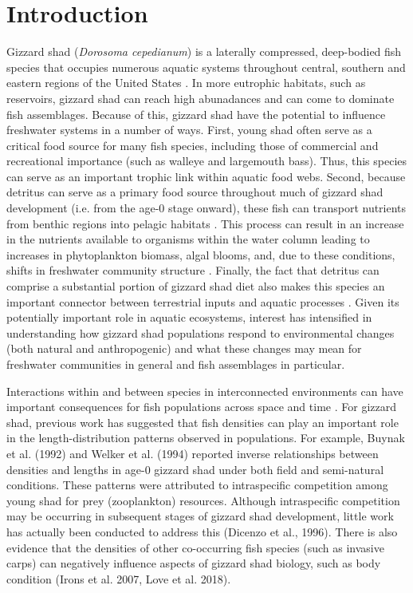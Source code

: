 \documentclass[preprint,review,12pt,authoryear]{elsarticle}
\begin{document}
\section{Introduction}
Gizzard shad (\emph{Dorosoma cepedianum}) is a laterally compressed, deep-bodied fish species that occupies numerous aquatic systems throughout central, southern and eastern regions of the United States \citep{pierce1981aspects,vanni2005linking}.  In more eutrophic habitats, such as reservoirs, gizzard shad can reach high abunadances and can come to dominate fish assemblages. Because of this, gizzard shad have the potential to influence freshwater systems in a number of ways. 
First, young shad often serve as a critical food source for many fish species, including those of commercial and recreational importance (such as walleye and largemouth bass)\citep{jester1972life}. Thus, this species can serve as an important trophic link within aquatic food webs.
Second, because detritus can serve as a primary food source throughout much of gizzard shad development (i.e. from the age-0 stage onward), these fish can transport nutrients
from benthic regions into pelagic habitats \citep{mather1995regeneration, schaus2000effects, vanni2005linking}. 
This process can result in an increase in the nutrients available to organisms within the water column leading to increases in phytoplankton biomass, algal blooms, and, due to these conditions, shifts in freshwater community structure \citep{aday2003direct, schaus2000effects}. 
Finally, the fact that detritus can comprise a substantial portion of gizzard shad diet also makes this species an important connector between terrestrial inputs and aquatic processes \citep{schaus2000effects}.
Given its potentially important role in aquatic ecosystems, interest has intensified in understanding how gizzard shad populations respond to environmental changes (both natural and anthropogenic) and what these changes may mean for freshwater communities in general and fish assemblages in particular.

Interactions within and between species in interconnected environments can have important consequences for fish populations across space and time \citep{thorp2006riverine}.  For gizzard shad, previous work has suggested that fish densities can play an important role in the length-distribution patterns observed in populations.  For example, Buynak et al. (1992) and Welker et al. (1994) reported inverse relationships between densities and lengths in age-0 gizzard shad under both field and semi-natural conditions.  These patterns were attributed to intraspecific competition among young shad for prey (zooplankton) resources. Although intraspecific competition may be occurring in subsequent stages of gizzard shad development, little work has actually been conducted to address this (Dicenzo et al., 1996). There is also evidence that the densities of other co-occurring fish species (such as invasive carps) can negatively influence aspects of gizzard shad biology, such as body condition (Irons et al. 2007, Love et al. 2018).     
\end{document}

